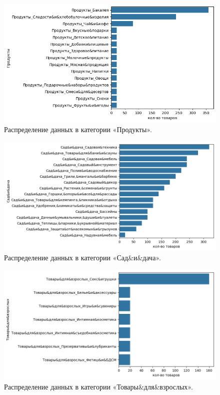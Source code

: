 \documentclass[a4paper,12pt]{extarticle}
\begin{document}
\begin{figure}[hbtp]
	\centering
	\includegraphics[scale=0.8]{приложения/amount_of_category_Продукты.png}
	\caption{Распределение данных в категории «Продукты».}
	\label{fig:amount_of_category_Продукты}
\end{figure}

\begin{figure}[hbtp]
	\centering
	\includegraphics[scale=0.8]{приложения/amount_of_category_Сад&и&дача.png}
	\caption{Распределение данных в категории «Сад\&и\&дача».}
	\label{fig:amount_of_category_Сад&и&дача}
\end{figure}

\begin{figure}[hbtp]
	\centering
	\includegraphics[scale=0.8]{приложения/amount_of_category_Товары&для&взрослых.png}
	\caption{Распределение данных в категории «Товары\&для\&взрослых».}
	\label{fig:amount_of_category_Товары&для&взрослых}
\end{figure}
\end{document}
